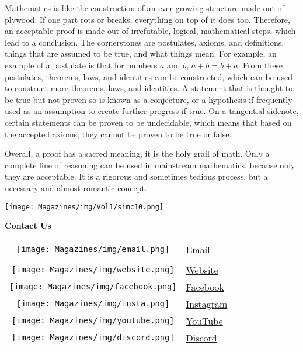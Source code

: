 \documentclass{article}
\begin{document}
\begin{multicols}{3}
Mathematics is like the construction of an ever-growing structure made out of plywood. If one part rots or breaks, everything on top of it does too. Therefore, an acceptable proof is made out of irrefutable, logical, mathematical steps, which lead to a conclusion. The cornerstones are postulates, axioms, and definitions, things that are assumed to be true, and what things mean. For example, an example of a postulate is that for numbers $a$ and $b$, $a + b = b + a$. From these postulates, theorems, laws, and identities can be constructed, which can be used to construct more theorems, laws, and identities. A statement that is thought to be true but not proven so is known as a conjecture, or a hypothesis if frequently used as an assumption to create further progress if true. On a tangential sidenote, certain statements can be proven to be undecidable, which means that based on the accepted axioms, they cannot be proven to be true or false. 

Overall, a proof has a sacred meaning, it is the holy grail of math. Only a complete line of reasoning can be used in mainstream mathematics, because only they are acceptable. It is a rigorous and sometimes tedious process, but a necessary and almost romantic concept.
\end{multicols}
\closearticle

\begin{multicols}{2}
  \begin{center}
      \texttt{[image: Magazines/img/Vol1/simc10.png]}
  \end{center}

\clearcolumn
\;

{\hspace{24mm} \sc\Large{\textbf{Contact Us}}}
\vspace{0.5mm}
\begin{center}
\begin{tabular}{c l}
  \texttt{[image: Magazines/img/email.png]}
    & \href{mailto:seattleinfinitymathcircle@gmail.com}{Email}\\
  \;\\
  \texttt{[image: Magazines/img/website.png]}
    & \href{https://seattleinfinity.org}{Website} \\
  \texttt{[image: Magazines/img/facebook.png]}
    & \href{https://www.facebook.com/simathcircle/}{Facebook} \\
  \texttt{[image: Magazines/img/insta.png]}
    & \href{https://www.instagram.com/seattleinfinitymathcircle/}{Instagram} \\
  \texttt{[image: Magazines/img/youtube.png]}
    & \href{https://www.youtube.com/channel/UCgwA-iysWPc_XG0R0AZ5z5g/videos}{YouTube} \\
  \texttt{[image: Magazines/img/discord.png]}
    & \href{https://discord.gg/2Ma3dURhTt}{Discord} 
\end{tabular}
\end{center}    
\end{multicols}
\end{document}
